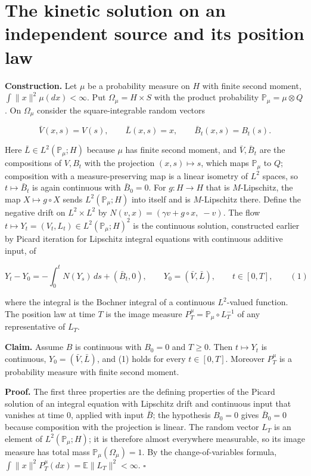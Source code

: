\documentclass[11pt,a4paper]{article}
\begin{document}
\section{\texorpdfstring{The kinetic solution on an independent source and its position law}{The kinetic solution on an independent source and its position law}}


\textbf{Construction.} Let \(\mu\) be a probability measure on \(H\) with finite second moment, \(\int\|x\|^2\mu(dx)<\infty\). Put \(\Omega_\mu=H\times S\) with the product probability \(\mathbb P_\mu=\mu\otimes Q\). On \(\Omega_\mu\) consider the square-integrable random vectors


\[\bar V(x,s)=V(s),\qquad \bar L(x,s)=x,\qquad \bar B_t(x,s)=B_t(s).\]


Here \(\bar L\in L^2(\mathbb P_\mu;H)\) because \(\mu\) has finite second moment, and \(\bar V,\bar B_t\) are the compositions of \(V,B_t\) with the projection \((x,s)\mapsto s\), which maps \(\mathbb P_\mu\) to \(Q\); composition with a measure-preserving map is a linear isometry of \(L^2\) spaces, so \(t\mapsto\bar B_t\) is again continuous with \(\bar B_0=0\). For \(g:H\to H\) that is \(M\)-Lipschitz, the map \(X\mapsto g\circ X\) sends \(L^2(\mathbb P_\mu;H)\) into itself and is \(M\)-Lipschitz there. Define the negative drift on \(L^2\times L^2\) by \(N(v,x)=(\gamma v+g\circ x,\;-v)\). The flow \(t\mapsto Y_t=(V_t,L_t)\in L^2(\mathbb P_\mu;H)^2\) is the continuous solution, constructed earlier by Picard iteration for Lipschitz integral equations with continuous additive input, of


\[Y_t-Y_0=-\int_0^tN(Y_s)\,ds+(\bar B_t,0),\qquad Y_0=(\bar V,\bar L),\qquad t\in[0,T],\qquad(1)\]


where the integral is the Bochner integral of a continuous \(L^2\)-valued function. The position law at time \(T\) is the image measure \(P^\mu_T=\mathbb P_\mu\circ L_T^{-1}\) of any representative of \(L_T\).




\textbf{Claim.} Assume \(B\) is continuous with \(B_0=0\) and \(T\ge0\). Then \(t\mapsto Y_t\) is continuous, \(Y_0=(\bar V,\bar L)\), and (1) holds for every \(t\in[0,T]\). Moreover \(P^\mu_T\) is a probability measure with finite second moment.




\textbf{Proof.} The first three properties are the defining properties of the Picard solution of an integral equation with Lipschitz drift and continuous input that vanishes at time \(0\), applied with input \(\bar B\); the hypothesis \(B_0=0\) gives \(\bar B_0=0\) because composition with the projection is linear. The random vector \(L_T\) is an element of \(L^2(\mathbb P_\mu;H)\); it is therefore almost everywhere measurable, so its image measure has total mass \(\mathbb P_\mu(\Omega_\mu)=1\). By the change-of-variables formula, \(\int\|x\|^2P^\mu_T(dx)=\mathbb E\|L_T\|^2<\infty\). \(\square\)
\end{document}
